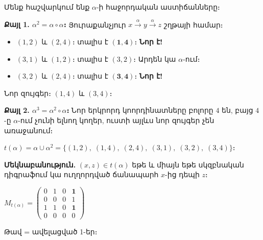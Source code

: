 \documentclass[12pt, a4paper]{article}
\begin{document}
\medskip

Մենք հաշվարկում ենք $\alpha$-ի հաջորդական աստիճանները։

\textbf{Քայլ 1. $\alpha^2 = \alpha \circ \alpha$։}\; Յուրաքանչյուր $x \xrightarrow{\alpha} y \xrightarrow{\alpha} z$ շղթայի համար։
\begin{itemize}[nosep]
  \item $(1,2)$ և $(2,4)$։ տալիս է $\boldsymbol{(1,4)}$։  \textbf{Նոր է!}
  \item $(3,1)$ և $(1,2)$։ տալիս է $(3,2)$։  Արդեն կա $\alpha$-ում։
  \item $(3,2)$ և $(2,4)$։ տալիս է $\boldsymbol{(3,4)}$։  \textbf{Նոր է!}
\end{itemize}
Նոր զույգեր։ $\boxed{(1,4) \text{ և } (3,4)}$։

\textbf{Քայլ 2. $\alpha^3 = \alpha^2 \circ \alpha$։}\; Նոր երկրորդ կոորդինատները բոլորը $4$ են, բայց $4$-ը $\alpha$-ում չունի ելնող կողեր, ուստի այլևս նոր զույգեր չեն առաջանում։

\begin{answerbox}
$t(\alpha) = \alpha \cup \alpha^2 = \{(1,2),\;(1,4),\;(2,4),\;(3,1),\;(3,2),\;(3,4)\}։$
\end{answerbox}

\textbf{Մեկնաբանություն.} $(x, z) \in t(\alpha)$ եթե և միայն եթե սկզբնական դիգրաֆում կա ուղղորդված ճանապարհ $x$-ից դեպի $z$։

\begin{center}
\begin{minipage}{0.45\textwidth}\centering
{}
\end{minipage}%
\begin{minipage}{0.45\textwidth}\centering
$M_{t(\alpha)} = \begin{pmatrix}
  0 & 1 & 0 & \mathbf{1} \\
  0 & 0 & 0 & 1 \\
  1 & 1 & 0 & \mathbf{1} \\
  0 & 0 & 0 & 0
\end{pmatrix}$

{\small\color{newEdge} Թավ = ավելացված 1-եր։}
\end{minipage}
\end{center}
\end{document}
